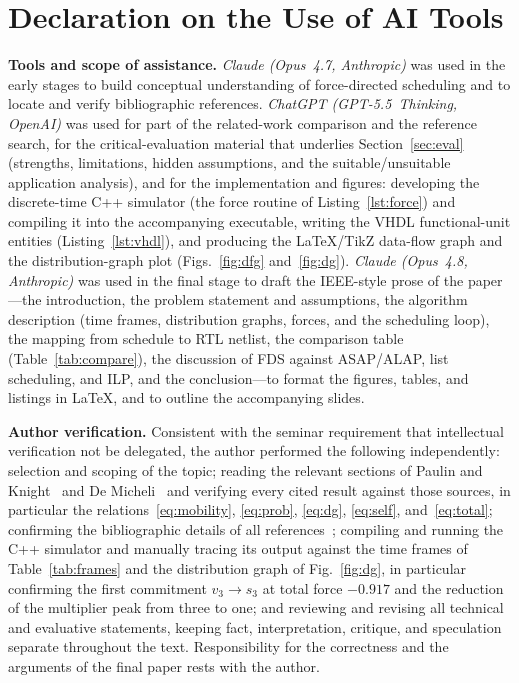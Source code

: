 \documentclass[conference]{IEEEtran}
\begin{document}
\section*{Declaration on the Use of AI Tools}
\textbf{Tools and scope of assistance.} \emph{Claude (Opus~4.7, Anthropic)} was
used in the early stages to build conceptual understanding of force-directed
scheduling and to locate and verify bibliographic references.
\emph{ChatGPT (GPT-5.5~Thinking, OpenAI)} was used for part of the related-work
comparison and the reference search, for the critical-evaluation material that
underlies Section~\ref{sec:eval} (strengths, limitations, hidden assumptions,
and the suitable/unsuitable application analysis), and for the implementation and
figures: developing the discrete-time C++ simulator (the force routine of
Listing~\ref{lst:force}) and compiling it into the accompanying executable,
writing the VHDL functional-unit entities (Listing~\ref{lst:vhdl}), and producing
the \LaTeX{}/TikZ data-flow graph and the distribution-graph plot
(Figs.~\ref{fig:dfg} and~\ref{fig:dg}). \emph{Claude (Opus~4.8, Anthropic)} was
used in the final stage to draft the IEEE-style prose of the paper---the
introduction, the problem statement and assumptions, the algorithm description
(time frames, distribution graphs, forces, and the scheduling loop), the mapping
from schedule to RTL netlist, the comparison table (Table~\ref{tab:compare}), the
discussion of FDS against ASAP/ALAP, list scheduling, and ILP, and the
conclusion---to format the figures, tables, and listings in \LaTeX{}, and to
outline the accompanying slides.

\textbf{Author verification.} Consistent with the seminar requirement that
intellectual verification not be delegated, the author performed the following
independently: selection and scoping of the topic; reading the relevant sections
of Paulin and Knight~\cite{b1} and De Micheli~\cite{b2} and verifying every cited
result against those sources, in particular the
relations~\eqref{eq:mobility}, \eqref{eq:prob}, \eqref{eq:dg}, \eqref{eq:self},
and~\eqref{eq:total}; confirming the bibliographic details of all
references~\cite{b1,b2,b3,b4,b5}; compiling and running the C++ simulator and
manually tracing its output against the time frames of Table~\ref{tab:frames} and
the distribution graph of Fig.~\ref{fig:dg}, in particular confirming the first
commitment $v_3\!\to\!s_3$ at total force $-0.917$ and the reduction of the
multiplier peak from three to one; and reviewing and revising all technical and
evaluative statements, keeping fact, interpretation, critique, and speculation
separate throughout the text. Responsibility for the correctness and the
arguments of the final paper rests with the author.
\end{document}
